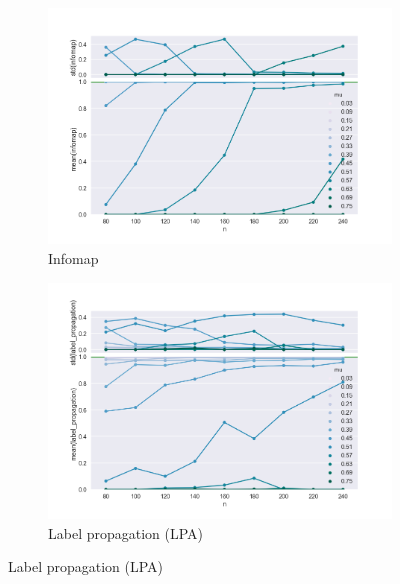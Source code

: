 \begin{figure}
    \begin{subfigure}[b]{0.32\textwidth}
        \includegraphics[width=\textwidth]{fig/nmi_vs_n_infomap}
        \caption{Infomap}
        \label{fig:mouse}
    \end{subfigure}
    \qquad
    \begin{subfigure}[b]{0.32\textwidth}
        \includegraphics[width=\textwidth]{fig/nmi_vs_n_label_propagation}
        \caption{Label propagation (LPA)}
        \label{fig:gull}
    \end{subfigure}
    

\end{figure}
